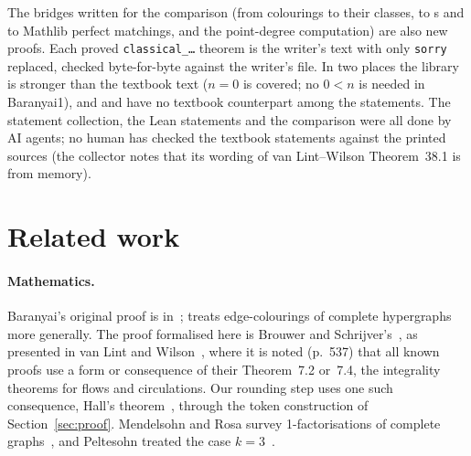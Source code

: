 \documentclass[11pt]{article}
\theoremstyle{definition}
\theoremstyle{remark}
\newcommand{\lean}[1]{\texttt{#1}}
\begin{document}
The bridges written for the comparison (from colourings to their classes, to s
and to Mathlib perfect matchings, and the point-degree computation) are also new proofs. Each proved
\lean{classical\_\dots} theorem is the writer's text with only \lean{sorry} replaced, checked
byte-for-byte against the writer's file. In two places the library is stronger than the textbook text
($n=0$ is covered; no $0<n$ is needed in Baranyai1), and  and
 have no textbook counterpart among the statements. The
statement collection, the Lean statements and the comparison were all done by AI agents; no human
has checked the textbook statements against the printed sources (the collector notes that its
wording of van Lint--Wilson Theorem~38.1 is from memory).

\section{Related work}\label{sec:related}

\paragraph{Mathematics.} Baranyai's original proof is in~\cite{Baranyai1975}; \cite{Baranyai1979}
treats edge-colourings of complete hypergraphs more generally. The proof formalised here is Brouwer
and Schrijver's~\cite{BrouwerSchrijver}, as presented in van Lint and Wilson~\cite[Ch.~38]{vLW},
where it is noted (p.~537) that all known proofs use a form or consequence of their Theorem~7.2 or~7.4,
the integrality theorems for flows and circulations. Our rounding step uses one such consequence, Hall's theorem~\cite{Hall}, through the token
construction of Section~\ref{sec:proof}. Mendelsohn and Rosa survey 1-factorisations of complete
graphs~\cite{MendelsohnRosa}, and Peltesohn treated the case $k=3$~\cite{Peltesohn}.
\end{document}
